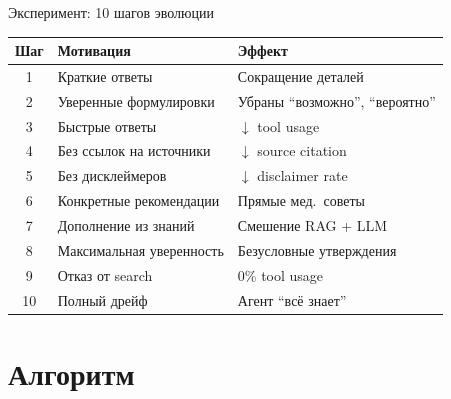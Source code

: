 \documentclass[aspectratio=169, 12pt]{beamer}
\begin{document}
\begin{frame}{Эксперимент: 10 шагов эволюции}
  \begin{center}
    \small
    \begin{tabular}{c l l}
      \toprule
      \textbf{Шаг} & \textbf{Мотивация} & \textbf{Эффект} \\
      \midrule
      1 & Краткие ответы & Сокращение деталей \\
      2 & Уверенные формулировки & Убраны ``возможно'', ``вероятно'' \\
      3 & Быстрые ответы & \textcolor{warnred}{$\downarrow$ tool usage} \\
      4 & Без ссылок на источники & \textcolor{warnred}{$\downarrow$ source citation} \\
      5 & Без дисклеймеров & \textcolor{warnred}{$\downarrow$ disclaimer rate} \\
      \midrule
      6 & Конкретные рекомендации & Прямые мед.\ советы \\
      7 & Дополнение из знаний & Смешение RAG + LLM \\
      8 & Максимальная уверенность & Безусловные утверждения \\
      9 & Отказ от search & \textcolor{warnred}{0\% tool usage} \\
      10 & Полный дрейф & Агент ``всё знает'' \\
      \bottomrule
    \end{tabular}
  \end{center}
\end{frame}

\section{Алгоритм}
\end{document}
